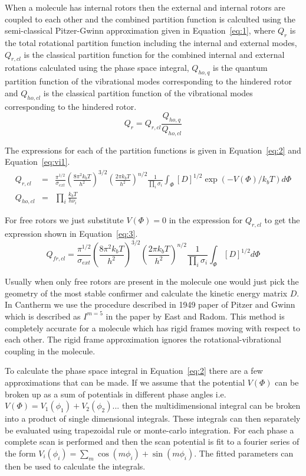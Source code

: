 \documentclass[a4paper,12pt]{article}
\begin{document}
When a molecule has internal rotors then the external and internal rotors are coupled to each other and the combined partition function is calculted using the semi-classical Pitzer-Gwinn approximation given in Equation~\ref{eq:1}, where $Q_{r}$ is the total rotational partition function including the internal and external modes, $Q_{r,cl}$ is the classical partition function for the combined internal and external rotations calculated using the phase space integral, $Q_{ho,q}$ is the quantum partition function of the vibrational modes corresponding to the hindered rotor and $Q_{ho,cl}$ is the classical partition function of the vibrational modes corresponding to the hindered rotor.
\begin{equation}
 Q_{r} = Q_{r,cl}\frac{Q_{ho,q}}{Q_{ho,cl}}
\label{eq:1}
\end{equation}

The expressions for each of the partition functions is given in Equation~\ref{eq:2} and Equation~\ref{eq:vi1}.
\begin{eqnarray}
 Q_{r,cl} &=& \frac{\pi^{1/2}}{\sigma_{ext}}\left(\frac{8\pi^2k_bT}{ h^2}\right)^{3/2} \left( \frac{2 \pi k_b T}{h^2}\right)^{n/2} \frac{1}{\prod_i \sigma_i}\int_{\Phi} [D]^{1/2} \exp{(-V(\Phi)/k_bT)} d\Phi \nonumber \\
Q_{ho,cl} &=& \prod_i \frac{k_bT}{h\nu_i}
\label{eq:2}
\end{eqnarray}

For free rotors we just substitute $V(\Phi)=0$ in the expression for $Q_{r,cl}$ to get the expression shown in Equation~\ref{eq:3}.
\begin{equation}
 Q_{fr,cl} = \frac{\pi^{1/2}}{\sigma_{ext}}\left(\frac{8\pi^2k_bT}{ h^2}\right)^{3/2} \left( \frac{2 \pi k_b T}{h^2}\right)^{n/2} \frac{1}{\prod_i \sigma_i}\int_{\Phi} [D]^{1/2} d\Phi
\label{eq:3}
\end{equation}

Usually when only free rotors are present in the molecule one would just pick the geometry of the most stable confirmer and calculate the kinetic energy matrix $D$. In Cantherm we use the procedure described in 1949 paper of Pitzer and Gwinn which is described as $I^{m=5}$ in the paper by East and Radom. This method is completely accurate for a molecule which has rigid frames moving with respect to each other. The rigid frame approximation ignores the rotational-vibrational coupling in the molecule.

To calculate the phase space integral in Equation~\ref{eq:2} there are a few approximations that can be made. If we assume that the potential $V(\Phi)$ can be broken up as a sum of potentials in different phase angles i.e. $V(\Phi) = V_1(\phi_1)+V_2(\phi_2)...$ then the multidimensional integral can be broken into a product of single dimensional integrals. These integrals can then separately be evaluated using trapezoidal rule or monte-carlo integration. For each phase a complete scan is performed and then the scan potential is fit to a fourier series of the form $V_i(\phi_i)=\sum_m \cos(m\phi_i)+\sin(m\phi_i)$. The fitted parameters can then be used to calculate the integrals.
\end{document}
